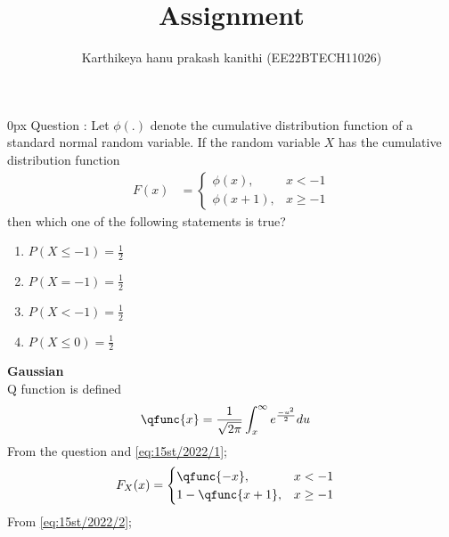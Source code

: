 \documentclass[article]{IEEEtran}
\theoremstyle{remark}
\begin{document}
\let\vec\mathbf


\title{
Assignment
}
\author{ Karthikeya hanu prakash kanithi (EE22BTECH11026)}
\maketitle
\parindent0px
\vspace{3cm}
Question : Let $\phi(.)$ denote the cumulative distribution function of a standard normal
random variable. If the random variable $X$ has the cumulative distribution
function 
\begin{align}
	F(x)&= 
    \begin{cases}
        \phi(x), &  x < -1 \\
        \phi(x+1) , &  x \ge -1
    \end{cases} 
\end{align}
then which one of the following statements is true?
\begin{enumerate}
\item $P(X \leq -1) = \frac{1}{2}$
\item $P(X = -1) = \frac{1}{2}$
\item $P(X < -1) = \frac{1}{2}$
\item $P(X \leq 0) = \frac{1}{2}$
\end{enumerate}
\fi
\solution 
\textbf{Gaussian}\\
Q function is defined
\begin{align}
	\qfunc{x} &= \frac{1}{\sqrt{2\pi}}\int_{x}^{\infty} e^{\frac{-u^2}{2}} du \label{eq:15st/2022/1}
\end{align}
From the question and \eqref{eq:15st/2022/1};
\begin{align}
	F_X(x) &= 
	\begin{cases}
        \qfunc{-x} , &  x < -1 \\
        1-\qfunc{x+1} , &  x \ge -1
        \end{cases} \label{eq:15st/2022/2}
\end{align}
From \eqref{eq:15st/2022/2};
\end{document}
